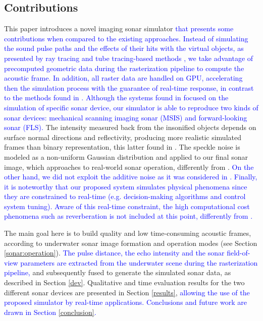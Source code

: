 \documentclass[final,5p,times]{elsarticle}
\begin{document}
\subsection{Contributions}

This paper introduces a novel imaging sonar simulator \textcolor{blue}{that presents some contributions when compared to the existing approaches. Instead of simulating the sound pulse paths and the effects of their hits with the virtual objects, as presented by ray tracing and tube tracing-based methods \cite{bell1997,coiras2009,sac2015,demarco2015,gu2013,kwak2015,gueriot2010}, we take advantage of precomputed geometric data during the rasterization pipeline to compute the acoustic frame. In addition, all raster data are handled on GPU, accelerating then the simulation process with the guarantee of real-time response, in contrast to the methods found in \cite{bell1997,coiras2009,sac2015,demarco2015}. Although the systems found in \cite{bell1997,coiras2009,sac2015,demarco2015,gu2013,kwak2015,gueriot2010} focused on the simulation of specific sonar device, our simulator is able to reproduce two kinds of sonar devices: mechanical scanning imaging sonar (MSIS) and forward-looking sonar (FLS).} The intensity measured back from the insonified objects depends on surface normal directions and reflectivity, producing more realistic simulated frames than binary representation, this latter found in \cite{gu2013,kwak2015}. The speckle noise is modeled as a non-uniform Gaussian distribution and applied to our final sonar image, which approaches to real-world sonar operation, differently from \cite{sac2015,demarco2015,gu2013,kwak2015,gueriot2010}. \textcolor{blue}{On the other hand, we did not exploit the additive noise as it was considered in \cite{sac2015,demarco2015}. Finally, it is noteworthy that our proposed system simulates physical phenomena since they are constrained to real-time (e.g. decision-making algorithms and control system tuning). Aware of this real-time constraint, the high computational cost phenomena such as reverberation is not included at this point, differently from \cite{sac2015,gueriot2010}.}

The main goal here is to build quality and low time\hyp{}consuming acoustic frames, according to underwater sonar image formation and operation modes (see Section \ref{sonar:operation}). \textcolor{blue}{The pulse distance, the echo intensity and the sonar field-of-view parameters are extracted from the underwater scene during the rasterization pipeline,} and subsequently fused to generate the simulated sonar data, as described in Section \ref{dev}. Qualitative and time evaluation results for the two different sonar devices are presented in Section \ref{results}, \textcolor{blue}{allowing the use of the proposed simulator by real-time applications. Conclusions and future work are drawn in Section \ref{conclusion}.}
\end{document}
